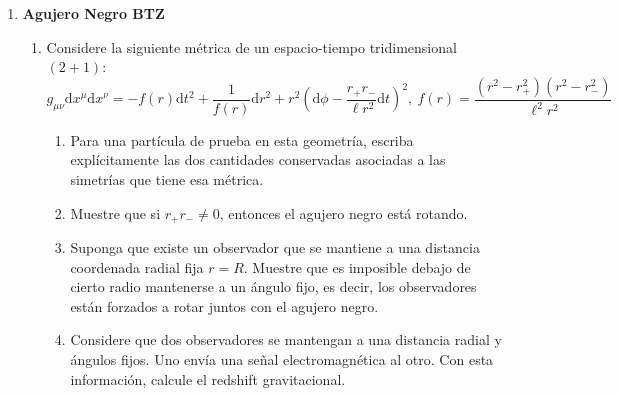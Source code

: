 \documentclass[../main]{subfiles}
\begin{document}
\begin{adjustwidth}{0pt}{-100pt}
\begin{enumerate}
    \item \textbf{Agujero Negro BTZ}
    \begin{enumerate}[label=(\alph*)]
        \item Considere la siguiente métrica de un espacio-tiempo tridimensional $(2+1)$:
        \begin{equation}
            g_{\mu\nu}\mathrm{d}x^{\mu}\mathrm{d}x^{\nu}=-f(r)\mathrm{d}t^2+\dfrac{1}{f(r)}\mathrm{d}r^2+r^2\left(\mathrm{d}\phi-\dfrac{r_{+}r_{-}}{\ell r^2}\mathrm{d}t\right)^2, \ f(r)=\dfrac{(r^2-r^2_+)(r^2-r^2_-)}{\ell^2 r^2}
        \end{equation}
        \begin{enumerate}[label=(\alph*)]
            \item Para una partícula de prueba en esta geometría, escriba explícitamente las dos cantidades conservadas asociadas a las simetrías que tiene esa métrica.
            \item Muestre que si $r_+ r_- \neq 0$, entonces el agujero negro está rotando.
            \item Suponga que existe un observador que se mantiene a una distancia coordenada radial fija $r=R$. Muestre que es imposible debajo de cierto radio mantenerse a un ángulo fijo, es decir, los observadores están forzados a rotar juntos con el agujero negro. 
            \item Considere que dos observadores se mantengan a una distancia radial y ángulos fijos. Uno envía una señal electromagnética al otro. Con esta información, calcule el redshift gravitacional.
        \end{enumerate}
    \end{enumerate}
\end{enumerate}
\end{adjustwidth}
\end{document}
